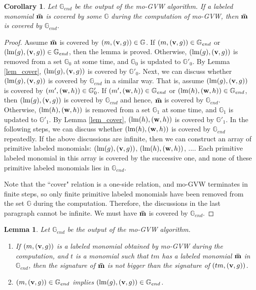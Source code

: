 \documentclass[final, number, 3p,12pt]{elsarticle}
\newtheorem{cor}[theorem]{Corollary}
\newtheorem{lemma}[theorem]{Lemma}
\def\G{{\mathbb{G}}}
\def\brm{{\bf \bar{m}}}
\def\lm{{\rm lm}} %
\def\v{{\bf v}}
\def\w{{\bf w}}
\begin{document}
\begin{cor} \label{cor_trans}
Let $\G_{end}$ be the output of the mo-GVW algorithm. If a labeled monomial $\brm$ is covered by some $\G$ during the computation of mo-GVW, then $\brm$ is covered by $\G_{end}$.
\end{cor}

\begin{proof}
Assume $\brm$ is covered by $(m, (\v, g)) \in \G$. If $(m, (\v, g)) \in \G_{end}$ or $(\lm(g), (\v, g)) \in \G_{end}$, then the lemma is proved. Otherwise, $(\lm(g), (\v, g))$ is removed from a set $\G_0$ at some time, and $\G_0$ is updated to $\G'_0$. By Lemma \ref{lem_cover}, $(\lm(g), (\v, g))$ is covered by $\G'_0$. Next, we can discuss whether $(\lm(g), (\v, g))$ is covered by $\G_{end}$ in a similar way. That is, assume $(\lm(g), (\v, g))$ is covered by $(m', (\w, h)) \in \G'_0$. If $(m', (\w, h)) \in \G_{end}$ or $(\lm(h), (\w, h)) \in \G_{end}$, then $(\lm(g), (\v, g))$ is covered by $\G_{end}$ and hence, $\brm$ is covered by $\G_{end}$. Otherwise, $(\lm(h), (\w, h))$ is removed from a set $\G_1$ at some time, and $\G_1$ is updated to $\G'_1$. By Lemma \ref{lem_cover}, $(\lm(h), (\w, h))$ is covered by $\G'_1$. In the following steps,  we can discuss whether $(\lm(h), (\w, h))$ is covered by $\G_{end}$ repeatedly. If the above discussions are infinite, then we can construct an array of primitive labeled monomials: $(\lm(g), (\v, g))$, $(\lm(h), (\w, h))$, ....  Each primitive labeled monomial in this array is covered by the successive one, and none of these primitive labeled monomials lies in $\G_{end}$.

Note that the ``cover" relation is a one-side relation, and mo-GVW terminates in finite steps, so only finite primitive labeled monomials have been removed from the set $\G$ during the computation. Therefore, the discussions in the last  paragraph cannot be infinite. We must have $\brm$ is covered by $\G_{end}$. 
\end{proof}



\begin{lemma} \label{lem_implie}
Let $\G_{end}$ be the output of the mo-GVW algorithm. 
\begin{enumerate}[(1)]

\item If $(m, (\v, g))$ is a labeled monomial obtained by mo-GVW during the computation,  and $t$ is a monomial such that $tm$ has a labeled monomial $\brm$ in $\G_{end}$, then the signature of $\brm$ is not bigger than the signature of $(tm, (\v, g))$.

\item $(m, (\v, g))\in \G_{end}$ implies $(\lm(g), (\v, g))\in \G_{end}$. 

\end{enumerate}
\end{lemma}
\end{document}

